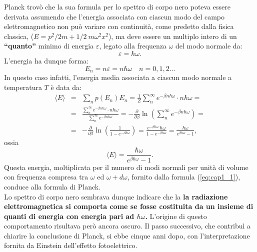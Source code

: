 \documentclass[a4paper,12pt,oneside]{book}
\begin{document}
Planck trovò che la sua formula  per lo spettro di corpo nero poteva essere derivata assumendo che l'energia associata con ciascun modo del campo elettromagnetico non può variare con continuità, come predetto dalla fisica classica, ($E= p^2/2m +1/2 \ m \omega ^2 x^2$), ma deve essere un multiplo intero di un \textbf{``quanto''} minimo di energia $\varepsilon$, legato alla frequenza $\omega$ del modo normale da:
	\begin{equation}
		\boxed{\boxed{
			\varepsilon = \hbar \omega .
			}}
	\end{equation}
L'energia ha dunque forma:
	\begin{equation}
	\boxed{\boxed{
		E_n = n\varepsilon = n \hbar \omega \quad n= 0,1,2...
		}}
\end{equation}
In questo caso infatti, l'energia media associata a ciascun modo normale a temperatura $T$ è data da:
	\begin{eqnarray}
		\langle E \rangle &=&\sum _n p(E_n) E_n =\frac{1}{Z}\sum _n ^{\infty} e^{-\beta n \hbar \omega} \cdot n\hbar \omega = \nonumber \\
		&=&\frac{\sum _n ^{\infty} e^{-\beta n \hbar \omega} \cdot n\hbar \omega}{\sum _n ^{\infty} e^{-\beta n \hbar \omega}}= - \frac{\partial}{\partial \beta} \ln \left( \sum _n ^{\infty} e^{-\beta n \hbar \omega}\right)= \nonumber \\
		&=&- \frac{\partial}{\partial \beta} \ln \left( \frac{1}{1- e^{-\beta \hbar \omega}}\right)=  \frac{e^{-\beta \hbar \omega}\ \hbar \omega}{1-e^{-\beta \hbar \omega}}= \frac{ \hbar \omega}{e^{\beta \hbar \omega}-1},
	\end{eqnarray}
ossia
	\begin{equation}
		\boxed{\boxed{
			\langle E \rangle = \frac{ \hbar \omega}{e^{\beta \hbar \omega}-1}.
			}}
	\end{equation}
Questa energia, moltiplicata per il numero di modi normali per unità di volume con frequenza compresa tra $\omega$ ed $\omega + d\omega$, fornito dalla formula (\ref{eq:cap1_1}), conduce alla formula di Planck.\\

Lo spettro di corpo nero sembrava dunque indicare che la \textbf{la radiazione elettromagnetica si comporta come se fosse costituita da un insieme di quanti di energia con energia pari ad $\hbar \omega $.}
L'origine di questo comportamento risultava però ancora oscuro. Il passo successivo, che contribuì a chiarire la conclusione di Planck, si ebbe cinque anni dopo, con l'interpretazione fornita da Einstein dell'effetto fotoelettrico.
\end{document}
